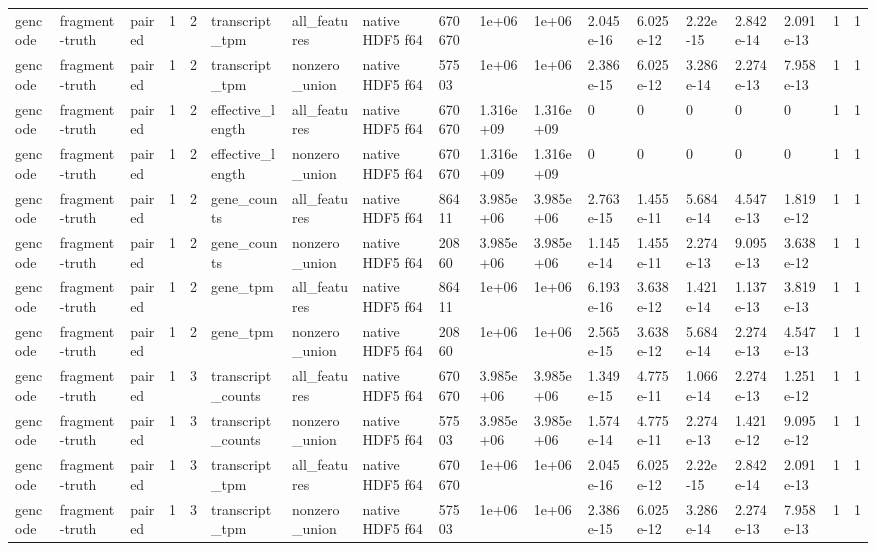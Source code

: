 \begin{tabular}{llllllllllllllllll}
gencode & fragment-truth & paired & 1 & 2 & transcript\_tpm & all\_features & native HDF5 f64 & 670670 & 1e+06 & 1e+06 & 2.045e-16 & 6.025e-12 & 2.22e-15 & 2.842e-14 & 2.091e-13 & 1 & 1 \\
gencode & fragment-truth & paired & 1 & 2 & transcript\_tpm & nonzero\_union & native HDF5 f64 & 57503 & 1e+06 & 1e+06 & 2.386e-15 & 6.025e-12 & 3.286e-14 & 2.274e-13 & 7.958e-13 & 1 & 1 \\
gencode & fragment-truth & paired & 1 & 2 & effective\_length & all\_features & native HDF5 f64 & 670670 & 1.316e+09 & 1.316e+09 & 0 & 0 & 0 & 0 & 0 & 1 & 1 \\
gencode & fragment-truth & paired & 1 & 2 & effective\_length & nonzero\_union & native HDF5 f64 & 670670 & 1.316e+09 & 1.316e+09 & 0 & 0 & 0 & 0 & 0 & 1 & 1 \\
gencode & fragment-truth & paired & 1 & 2 & gene\_counts & all\_features & native HDF5 f64 & 86411 & 3.985e+06 & 3.985e+06 & 2.763e-15 & 1.455e-11 & 5.684e-14 & 4.547e-13 & 1.819e-12 & 1 & 1 \\
gencode & fragment-truth & paired & 1 & 2 & gene\_counts & nonzero\_union & native HDF5 f64 & 20860 & 3.985e+06 & 3.985e+06 & 1.145e-14 & 1.455e-11 & 2.274e-13 & 9.095e-13 & 3.638e-12 & 1 & 1 \\
gencode & fragment-truth & paired & 1 & 2 & gene\_tpm & all\_features & native HDF5 f64 & 86411 & 1e+06 & 1e+06 & 6.193e-16 & 3.638e-12 & 1.421e-14 & 1.137e-13 & 3.819e-13 & 1 & 1 \\
gencode & fragment-truth & paired & 1 & 2 & gene\_tpm & nonzero\_union & native HDF5 f64 & 20860 & 1e+06 & 1e+06 & 2.565e-15 & 3.638e-12 & 5.684e-14 & 2.274e-13 & 4.547e-13 & 1 & 1 \\
gencode & fragment-truth & paired & 1 & 3 & transcript\_counts & all\_features & native HDF5 f64 & 670670 & 3.985e+06 & 3.985e+06 & 1.349e-15 & 4.775e-11 & 1.066e-14 & 2.274e-13 & 1.251e-12 & 1 & 1 \\
gencode & fragment-truth & paired & 1 & 3 & transcript\_counts & nonzero\_union & native HDF5 f64 & 57503 & 3.985e+06 & 3.985e+06 & 1.574e-14 & 4.775e-11 & 2.274e-13 & 1.421e-12 & 9.095e-12 & 1 & 1 \\
gencode & fragment-truth & paired & 1 & 3 & transcript\_tpm & all\_features & native HDF5 f64 & 670670 & 1e+06 & 1e+06 & 2.045e-16 & 6.025e-12 & 2.22e-15 & 2.842e-14 & 2.091e-13 & 1 & 1 \\
gencode & fragment-truth & paired & 1 & 3 & transcript\_tpm & nonzero\_union & native HDF5 f64 & 57503 & 1e+06 & 1e+06 & 2.386e-15 & 6.025e-12 & 3.286e-14 & 2.274e-13 & 7.958e-13 & 1 & 1 \\

\end{tabular}
